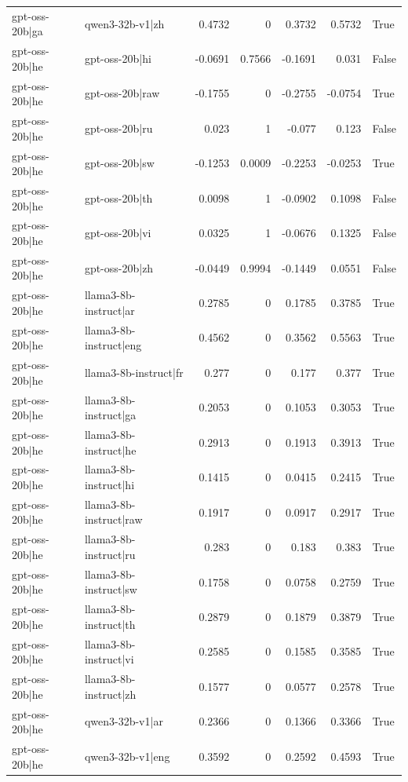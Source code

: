 \begin{table}
\begin{tabular}{l l r r r r l}
gpt-oss-20b|ga & qwen3-32b-v1|zh & 0.4732 & 0 & 0.3732 & 0.5732 & True \\
gpt-oss-20b|he & gpt-oss-20b|hi & -0.0691 & 0.7566 & -0.1691 & 0.031 & False \\
gpt-oss-20b|he & gpt-oss-20b|raw & -0.1755 & 0 & -0.2755 & -0.0754 & True \\
gpt-oss-20b|he & gpt-oss-20b|ru & 0.023 & 1 & -0.077 & 0.123 & False \\
gpt-oss-20b|he & gpt-oss-20b|sw & -0.1253 & 0.0009 & -0.2253 & -0.0253 & True \\
gpt-oss-20b|he & gpt-oss-20b|th & 0.0098 & 1 & -0.0902 & 0.1098 & False \\
gpt-oss-20b|he & gpt-oss-20b|vi & 0.0325 & 1 & -0.0676 & 0.1325 & False \\
gpt-oss-20b|he & gpt-oss-20b|zh & -0.0449 & 0.9994 & -0.1449 & 0.0551 & False \\
gpt-oss-20b|he & llama3-8b-instruct|ar & 0.2785 & 0 & 0.1785 & 0.3785 & True \\
gpt-oss-20b|he & llama3-8b-instruct|eng & 0.4562 & 0 & 0.3562 & 0.5563 & True \\
gpt-oss-20b|he & llama3-8b-instruct|fr & 0.277 & 0 & 0.177 & 0.377 & True \\
gpt-oss-20b|he & llama3-8b-instruct|ga & 0.2053 & 0 & 0.1053 & 0.3053 & True \\
gpt-oss-20b|he & llama3-8b-instruct|he & 0.2913 & 0 & 0.1913 & 0.3913 & True \\
gpt-oss-20b|he & llama3-8b-instruct|hi & 0.1415 & 0 & 0.0415 & 0.2415 & True \\
gpt-oss-20b|he & llama3-8b-instruct|raw & 0.1917 & 0 & 0.0917 & 0.2917 & True \\
gpt-oss-20b|he & llama3-8b-instruct|ru & 0.283 & 0 & 0.183 & 0.383 & True \\
gpt-oss-20b|he & llama3-8b-instruct|sw & 0.1758 & 0 & 0.0758 & 0.2759 & True \\
gpt-oss-20b|he & llama3-8b-instruct|th & 0.2879 & 0 & 0.1879 & 0.3879 & True \\
gpt-oss-20b|he & llama3-8b-instruct|vi & 0.2585 & 0 & 0.1585 & 0.3585 & True \\
gpt-oss-20b|he & llama3-8b-instruct|zh & 0.1577 & 0 & 0.0577 & 0.2578 & True \\
gpt-oss-20b|he & qwen3-32b-v1|ar & 0.2366 & 0 & 0.1366 & 0.3366 & True \\
gpt-oss-20b|he & qwen3-32b-v1|eng & 0.3592 & 0 & 0.2592 & 0.4593 & True \\

\end{tabular}
\end{table}

